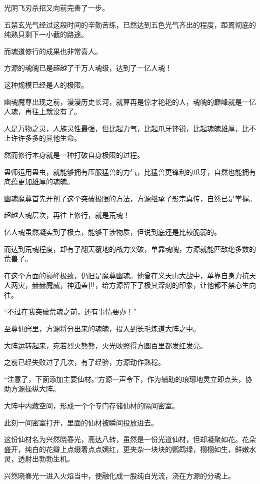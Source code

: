\begin{this_body}
光阴飞刃杀招又向前完善了一步。

五禁玄光气经过这段时间的辛勤苦练，已然达到五色光气齐出的程度，距离彻底的纯熟只剩下一小截的路途。

而魂道修行的成果也非常喜人。

方源的魂魄已是超越了千万人魂级，达到了一亿人魂！

这种规模已经是人的极限。

幽魂魔尊出现之前，漫漫历史长河，就算再是惊才艳艳的人，魂魄的巅峰就是一亿人魂，再往上就没有了。

人是万物之灵，人族灵性最强，但比起力气，比起爪牙锋锐，比起魂魄雄厚，比不上许许多多的其他生命。

然而修行本身就是一种打破自身极限的过程。

蛊师运用蛊虫，就能够拥有压服猛兽的力气，比猛兽更锋利的爪牙，自然也能拥有底蕴更加雄厚的魂魄。

幽魂魔尊首先开创了这个突破极限的方法，方源继承了影宗真传，自然已是掌握。

超越人魂层次，再往上修行，就是荒魂！

亿人魂虽然凝实到了极点，能够干涉物质，但说到底还是比较脆弱的。

而达到荒魂程度，却有了翻天覆地的战力突破，单靠魂魄，方源就能匹敌绝多数的荒兽了。

在这个方面的巅峰极致，仍旧是魔尊幽魂。他曾在义天山大战中，单靠自身力抗天人两灾，赫赫魔威，神通盖世，给方源留下了极其深刻的印象，让他都不禁心生向往。

“不过在我突破荒魂之前，还有事情要办！”

至尊仙窍里，方源将分出来的魂魄，投入到长毛炼道大阵之中。

大阵运转起来，宛若烈火熊熊，火光映照得方圆百里都发红发亮。

之前已经失败过了几次，有了经验，方源动作熟稔。

“注意了，下面添加主要仙材。”方源一声令下，作为辅助的琅琊地灵立即点头，协助方源操纵大阵。

大阵中内藏空间，形成一个个专门存储仙材的隔间密室。

此刻一间密室打开，里面的仙材被瞬间投放进去。

这份仙材名为兴然晓春光，高达八转，虽然是一份光道仙材，但却凝聚如花。花朵盛开，纯白的花瓣上点缀着点点嫣红，更夹杂一块块的鹦鹉绿，栩栩如生，鲜嫩水灵，透射出勃勃生机。

兴然晓春光一进入火焰当中，便融化成一股纯白光流，浇在方源的分魂上。


\end{this_body}
